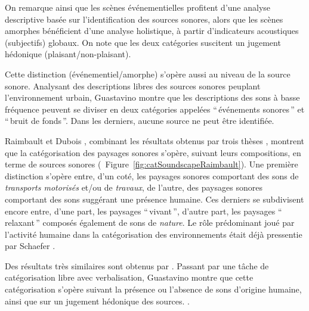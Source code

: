 {{On remarque ainsi que les scènes événementielles profitent d'une analyse descriptive basée sur l'identification des sources sonores, alors que les scènes amorphes bénéficient d'une analyse holistique, à partir d'indicateurs acoustiques (subjectifs) globaux. On note que les deux catégories suscitent un jugement hédonique (plaisant/non-plaisant).

Cette distinction (événementiel/amorphe) s'opère aussi au niveau de la source sonore. Analysant des descriptions libres des sources sonores peuplant l’environnement urbain, Guastavino montre que les descriptions des sons à basse fréquence peuvent se diviser en deux catégories appelées ``\,événements sonores\,'' et ``\,bruit de fonds\,''. Dans les derniers, aucune source ne peut être identifiée.

Raimbault et Dubois \citep{raimbault2005urban}, combinant les résultats obtenus par trois thèses \citep{maffiolo_caracterisation_1999, raimbault2002simulation, guastavino_etude_2003}, montrent que la catégorisation des paysages sonores s'opère, suivant leurs compositions, en terme de sources sonores (\cf~Figure~\ref{fig:catSoundscapeRaimbault}). Une première distinction s'opère entre, d'un coté, les paysages sonores comportant des sons de \emph{transports motorisés} et/ou de \emph{travaux}, de l'autre, des paysages sonores comportant des sons suggérant une présence humaine. Ces derniers se subdivisent encore entre, d'une part, les paysages ``\,vivant\,'', d'autre part, les paysages ``\,relaxant\,'' composés également de sons de \emph{nature}. Le rôle prédominant joué par l'activité humaine dans la catégorisation des environnements était déjà pressentie par Schaefer \citep{schafer1977tuning}.

Des résultats très similaires sont obtenus par \citep{guastavino2007categorization}. Passant par une tâche de catégorisation libre avec verbalisation, Guastavino montre que cette catégorisation s'opère suivant la présence ou l'absence de sons d'origine humaine, ainsi que sur un jugement hédonique des sources.  .

}}
